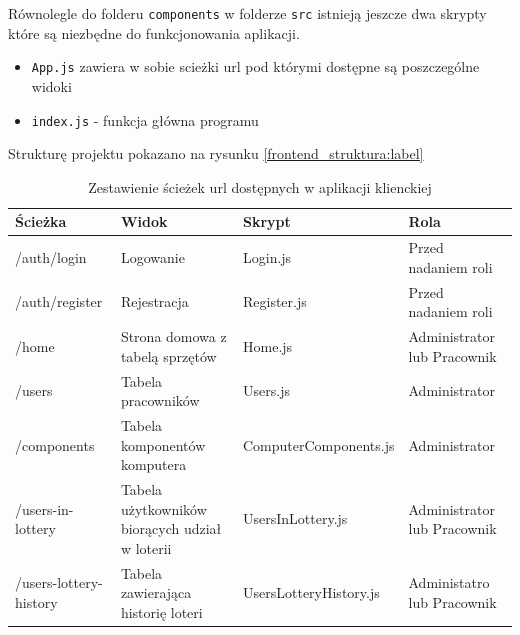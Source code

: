 Równolegle do folderu \texttt{components} w folderze \texttt{src} istnieją jeszcze dwa skrypty które są niezbędne do funkcjonowania aplikacji.
\begin{itemize}
	\item \texttt{App.js} zawiera w sobie scieżki url pod którymi dostępne są poszczególne widoki
	\item \texttt{index.js} - funkcja główna programu
\end{itemize}

Strukturę projektu pokazano na rysunku \ref{frontend_struktura:label}


\begin{table}[htb] \small
	\centering
\caption{Zestawienie ścieżek url dostępnych w aplikacji klienckiej}
\label{tab:zestawienie_widokow}
\begin{tabularx}{\linewidth}{|X|X|X|X|}
    \hline
    Ścieżka & Widok & Skrypt & Rola\\
    \hline \hline
    /auth/login & Logowanie &  Login.js & Przed nadaniem roli\\
    \hline
    /auth/register & Rejestracja & Register.js & Przed nadaniem roli\\
    \hline
    /home & Strona domowa z tabelą sprzętów & Home.js & Administrator lub Pracownik\\
    \hline
    /users & Tabela pracowników & Users.js & Administrator\\
    \hline
		/components & Tabela komponentów komputera& ComputerComponents.js & Administrator\\
    \hline
		/users-in-lottery & Tabela użytkowników biorących udział w loterii& UsersInLottery.js & Administrator lub Pracownik\\
    \hline
		/users-lottery-history & Tabela zawierająca historię loteri & UsersLotteryHistory.js & Administatro lub Pracownik\\

    \hline
\end{tabularx}
\end{table}


